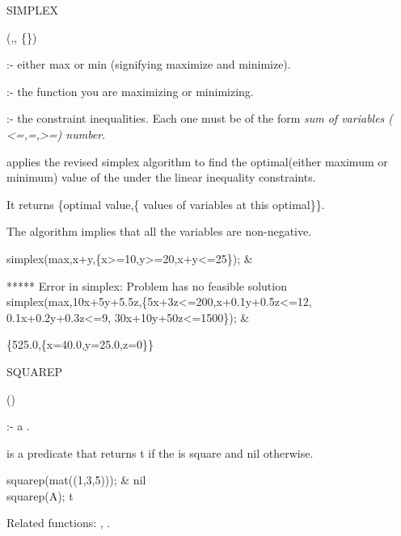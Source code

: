 \begin{Operator}[simplex]{SIMPLEX}

\begin{Syntax}
(,,
\{\})
\end{Syntax}

             :- either max or min (signifying maximize and
			      minimize).

  :- the function you are maximizing or
			      minimizing.

 :- the constraint inequalities. Each one must
                              be of the form {\it sum of variables (
                              <=,=,>=) number}.

 applies the revised simplex algorithm to find the 
optimal(either maximum or minimum) value of the 
 under the linear inequality constraints.

It returns \{optimal value,\{ values of variables at this optimal\}\}.

The algorithm implies that all the variables are non-negative.

\begin{Examples}

 simplex(max,x+y,\{x>=10,y>=20,x+y<=25\}); &

 ***** Error in simplex: Problem has no feasible solution\\

simplex(max,10x+5y+5.5z,\{5x+3z<=200,x+0.1y+0.5z<=12,
0.1x+0.2y+0.3z<=9, 30x+10y+50z<=1500\}); &

\{525.0,\{x=40.0,y=25.0,z=0\}\}\\

\end{Examples}

\end{Operator}


\begin{Operator}[squarep]{SQUAREP}

\begin{Syntax}
()
\end{Syntax}
 
 :- a .

 is a predicate that returns t if the  is 
square and nil otherwise.

\begin{Examples}

squarep(mat((1,3,5))); &
nil \\
squarep(A);
t\\

\end{Examples}

Related functions: , .

\end{Operator}


